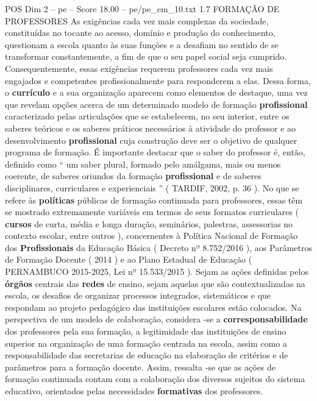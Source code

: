 \begin{textsample}{POS Dim 2 – pe – Score 18.00 – pe/pe\_em\_10.txt}  \label{ex:f2_pos_259}
1.7 FORMAÇÃO DE PROFESSORES As exigências cada vez mais complexas da sociedade, constituídas no tocante ao acesso, domínio e produção do conhecimento, questionam a escola quanto às suas funções e a desafiam no sentido de se transformar constantemente, a fim de que o seu papel social seja cumprido.
Consequentemente, essas exigências requerem professores cada vez mais engajados e competentes profissionalmente para responderem a elas.
Dessa forma, o \textbf{currículo} e a sua organização aparecem como elementos de destaque, uma vez que revelam opções acerca de um determinado modelo de formação \textbf{profissional} caracterizado pelas articulações que se estabelecem, no seu interior, entre os saberes teóricos e os saberes práticos necessários à atividade do professor e ao desenvolvimento \textbf{profissional} cuja construção deve ser o objetivo de qualquer programa de formação.
É importante destacar que o saber do professor é, então, definido como “ um saber plural, formado pelo amálgama, mais ou menos coerente, de saberes oriundos da formação \textbf{profissional} e de saberes disciplinares, curriculares e experienciais ” ( TARDIF, 2002, p. 36 ).
No que se refere às \textbf{políticas} públicas de formação continuada para professores, essas têm se mostrado extremamente variáveis em termos de seus formatos curriculares ( \textbf{cursos} de curta, média e longa duração, seminários, palestras, assessorias no contexto escolar, entre outros ), concernentes à Política Nacional de Formação dos \textbf{Profissionais} da Educação Básica ( Decreto nº 8.752/2016 ), aos Parâmetros de Formação Docente ( 2014 ) e ao Plano Estadual de Educação ( PERNAMBUCO 2015-2025, Lei nº 15.533/2015 ).
Sejam as ações definidas pelos \textbf{órgãos} centrais das \textbf{redes} de ensino, sejam aquelas que são contextualizadas na escola, os desafios de organizar processos integrados, sistemáticos e que respondam ao projeto pedagógico das instituições escolares estão colocados.
Na perspectiva de um modelo de colaboração, considera -se a \textbf{corresponsabilidade} dos professores pela sua formação, a legitimidade das instituições de ensino superior na organização de uma formação centrada na escola, assim como a responsabilidade das secretarias de educação na elaboração de critérios e de parâmetros para a formação docente.
Assim, ressalta -se que as ações de formação continuada contam com a colaboração dos diversos sujeitos do sistema educativo, orientados pelas necessidades \textbf{formativas} dos professores.

\end{textsample}
